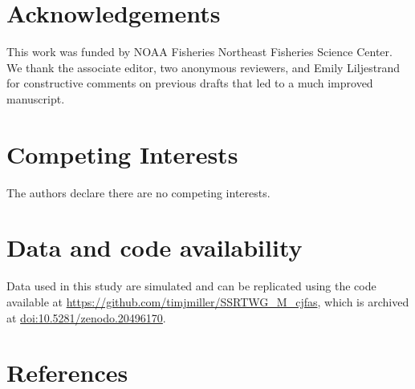 \documentclass[
  12pt,
]{article}
\begin{document}
\section*{Acknowledgements}\label{acknowledgements}

This work was funded by NOAA Fisheries Northeast Fisheries Science
Center. We thank the associate editor, two anonymous reviewers, and
Emily Liljestrand for constructive comments on previous drafts that led
to a much improved manuscript.

\section*{Competing Interests}\label{competing-interests}

The authors declare there are no competing interests.

\section*{Data and code availability}\label{data-and-code-availability}

Data used in this study are simulated and can be replicated using the
code available at \url{https://github.com/timjmiller/SSRTWG_M_cjfas},
which is archived at
\href{https://doi.org/10.5281/zenodo.20496170}{doi:10.5281/zenodo.20496170}.

\section*{References}\label{references}
\end{document}
